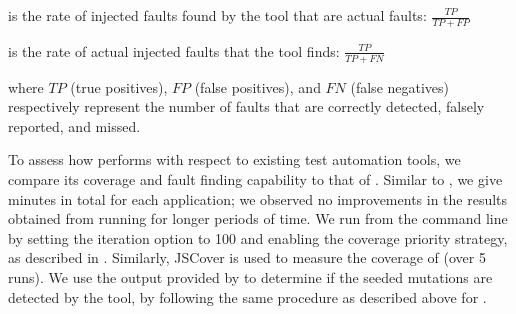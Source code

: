 \begin{description}
\item[Precision] is the rate of injected faults found by the tool that are actual faults: $\frac{\mathit{TP}}{\mathit{TP} + \mathit{FP}}$
\item[Recall] is the rate of actual injected faults that the tool finds: $\frac{\mathit{TP}}{\mathit{TP} + \mathit{FN}}$ 
\end{description}
where $\textit{TP}$ (true positives), $\textit{FP}$ (false positives), and $\textit{FN}$ (false negatives) respectively represent the number of faults that are correctly detected, falsely reported, and missed.

 \label{comparison-setup}
To assess how \tool performs with respect to existing \javascript test automation tools, we compare its coverage and fault finding capability to that of \artemis \cite{artzi:icse11}.  
Similar to \tool, we give  minutes in total for each application; we observed no improvements in the results obtained from running \artemis for longer periods of time. 
We run \artemis from the command line by setting the iteration option to 100 and enabling the coverage priority strategy, as described in \cite{artzi:icse11}. %
Similarly, JSCover is used to measure the coverage of \artemis (over 5 runs).
We use the output provided by \artemis to determine if the seeded mutations are detected by the tool, by following the same procedure as described above for \tool. 




%


  
